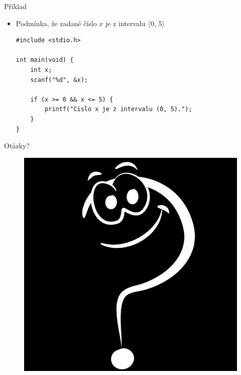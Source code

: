 \documentclass[14pt]{beamer}
\begin{document}
    \begin{frame}[t,fragile]{Příklad}
        \begin{itemize}
            \item Podmínka, že zadané číslo $x$ je z intervalu $\langle 0,\,5\rangle$
            \begin{lstlisting}
#include <stdio.h>

int main(void) {
    int x;
    scanf("%d", &x);

    if (x >= 0 && x <= 5) {
        printf("Cislo x je z intervalu (0, 5).");
    }
}
            \end{lstlisting}
        \end{itemize}
    \end{frame}

    \begin{frame}{Otázky?}
        \begin{figure}
            \centering
            \includegraphics[scale=.4]{images/discussion_inverted.png}
        \end{figure}
    \end{frame}
\end{document}

